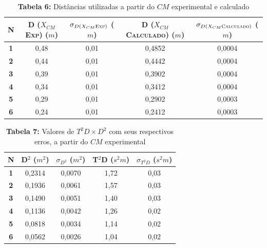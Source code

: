 \documentclass{article}
\begin{document}
\begin{table}[!ht]
	\begin{center}
		\caption*{\textbf{Tabela 6:} Distâncias utilizadas a partir do $CM$ experimental e calculado}
		\begin{tabular}{| c | c | c | c | c |}
			\hline  \multicolumn{1}{|c}{\textbf{N}} & \multicolumn{1}{|c|}{\textbf{D ($X_{CM}$ \textsc{Exp})} ($m$)} & \multicolumn{1}{c|}{\textbf{$\sigma_{D (X_{CM} \textsc{Exp})}$} ($m$)} & \multicolumn{1}{c|}{\textbf{D ($X_{CM}$ \textsc{Calculado})} ($m$)} & \multicolumn{1}{c|}{\textbf{$\sigma_{D (X_{CM} \textsc{Calculado})}$} ($m$)} \\  \hline
			\multicolumn{0}{|c|}{\textbf{1}} &0,48&0,01&0,4852&0,0004\\ \hline
			\multicolumn{0}{|c|}{\textbf{2}} & 0,44&0,01&0,4442&0,0004 \\ \hline
			\multicolumn{0}{|c|}{\textbf{3}} & 0,39&0,01&0,3902&0,0004 \\ \hline
			\multicolumn{0}{|c|}{\textbf{4}} &0,34&0,01&0,3412&0,0004 \\ \hline
			\multicolumn{0}{|c|}{\textbf{5}} &0,29&0,01&0,2902&0,0003\\ \hline
			\multicolumn{0}{|c|}{\textbf{6}} &0,24&0,01&0,2412&0,0003\\ \hline
		\end{tabular}
	\end{center}
\end{table}

\afterpage{\clearpage}

\begin{table}[!ht]
	\begin{center}
		\caption*{\textbf{Tabela 7:} Valores de $T^2D \times D^2$ com seus respectivos erros, a partir do $CM$ experimental}
		\begin{tabular}{| c | c | c | c | c |}
			\hline  \multicolumn{1}{|c|}{\textbf{N}} & \multicolumn{1}{c|}{\textbf{D$^2$ ($m^2$)}} & \multicolumn{1}{c|}{\textbf{$\sigma_{D^2}$ ($m^2$)}} & \multicolumn{1}{c|}{\textbf{T$^2$D ($s^2m$)}} & \multicolumn{1}{c|}{\textbf{$\sigma_{T^2D}$ ($s^2m$)}} \\  \hline
			\multicolumn{0}{|c|}{\textbf{1}} &0,2314&0,0070&1,72&0,03 \\ \hline
			\multicolumn{0}{|c|}{\textbf{2}} & 0,1936&0,0061&1,57&0,03 \\ \hline
			\multicolumn{0}{|c|}{\textbf{3}} & 0,1490&0,0051&1,40&0,03 \\ \hline
			\multicolumn{0}{|c|}{\textbf{4}} &0,1136&0,0042&1,26&0,02\\ \hline
			\multicolumn{0}{|c|}{\textbf{5}}&0,0818&0,0034&1,14&0,02 \\ \hline
			\multicolumn{0}{|c|}{\textbf{6}}&0,0562&0,0026&1,04&0,02 \\ \hline
		\end{tabular}
	\end{center}
\end{table}
\end{document}
